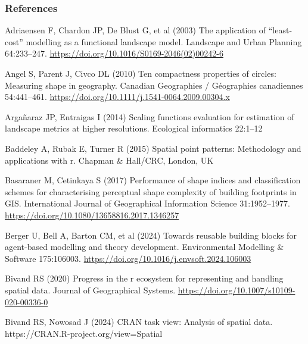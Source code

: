 \documentclass[
  10pt,
  a4paperpaper,
]{article}
\newlength{\cslhangindent}
\newenvironment{CSLReferences}[2] %
 {\begin{list}{}{%
  \setlength{\itemindent}{0pt}
  \setlength{\leftmargin}{0pt}
  \setlength{\parsep}{0pt}
  \ifodd #1
   \setlength{\leftmargin}{\cslhangindent}
   \setlength{\itemindent}{-1\cslhangindent}
  \fi
  \setlength{\itemsep}{#2\baselineskip}}}
 {\end{list}}
\begin{document}
\newpage{}

\subsubsection*{References}\label{references}

\begingroup
\raggedright

\label{refs}
\begin{CSLReferences}{1}{1}
Adriaensen F, Chardon JP, De Blust G, et al (2003) The application of
{``least-cost''} modelling as a functional landscape model. Landscape
and Urban Planning 64:233--247.
\url{https://doi.org/10.1016/S0169-2046(02)00242-6}

Angel S, Parent J, Civco DL (2010) Ten compactness properties of
circles: Measuring shape in geography. Canadian Geographies /
G{é}ographies canadiennes 54:441--461.
\url{https://doi.org/10.1111/j.1541-0064.2009.00304.x}

Argañaraz JP, Entraigas I (2014) Scaling functions evaluation for
estimation of landscape metrics at higher resolutions. Ecological
informatics 22:1--12

Baddeley A, Rubak E, Turner R (2015) Spatial point patterns: Methodology
and applications with r. Chapman \& Hall/CRC, London, UK

Basaraner M, Cetinkaya S (2017) Performance of shape indices and
classification schemes for characterising perceptual shape complexity of
building footprints in GIS. International Journal of Geographical
Information Science 31:1952--1977.
\url{https://doi.org/10.1080/13658816.2017.1346257}

Berger U, Bell A, Barton CM, et al (2024) Towards reusable building
blocks for agent-based modelling and theory development. Environmental
Modelling \& Software 175:106003.
\url{https://doi.org/10.1016/j.envsoft.2024.106003}

Bivand RS (2020) Progress in the r ecosystem for representing and
handling spatial data. Journal of Geographical Systems.
\url{https://doi.org/10.1007/s10109-020-00336-0}

Bivand RS, Nowosad J (2024) CRAN task view: Analysis of spatial data.
{https://CRAN.R-project.org/view=Spatial}


\end{CSLReferences}
\end{document}
